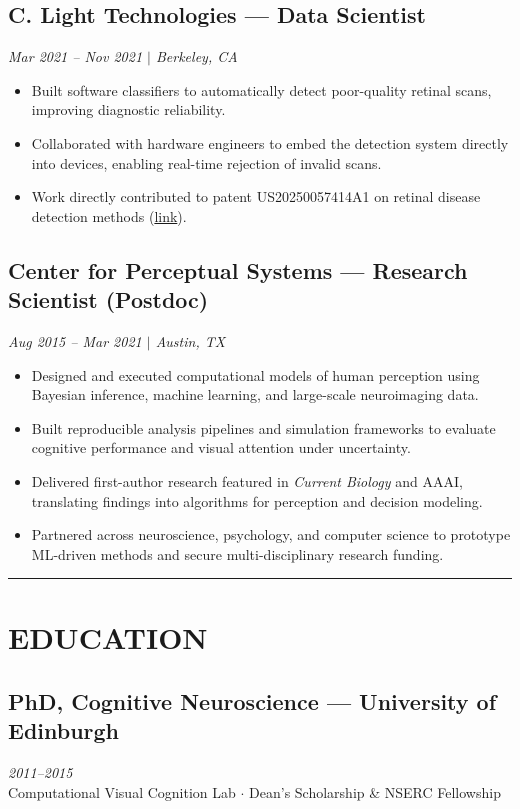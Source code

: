 \documentclass[11pt,a4paper]{article}
\newcommand{\sepline}{\noindent\rule{\textwidth}{0.5pt}\vspace{0.5em}}
\begin{document}
\subsection*{C. Light Technologies --- Data Scientist}
\textit{Mar 2021 -- Nov 2021 $\mid$ Berkeley, CA}
\begin{itemize}
    \item Built software classifiers to automatically detect poor-quality retinal scans, improving diagnostic reliability.
    \item Collaborated with hardware engineers to embed the detection system directly into devices, enabling real-time rejection of invalid scans.
    \item Work directly contributed to patent US20250057414A1 on retinal disease detection methods (\href{https://patents.google.com/patent/US20250057414A1/}{link}).
\end{itemize}

\subsection*{Center for Perceptual Systems --- Research Scientist (Postdoc)}
\textit{Aug 2015 -- Mar 2021 $\mid$ Austin, TX}
\begin{itemize}
    \item Designed and executed computational models of human perception using Bayesian inference, machine learning, and large-scale neuroimaging data.
    \item Built reproducible analysis pipelines and simulation frameworks to evaluate cognitive performance and visual attention under uncertainty.
    \item Delivered first-author research featured in \textit{Current Biology} and AAAI, translating findings into algorithms for perception and decision modeling.
    \item Partnered across neuroscience, psychology, and computer science to prototype ML-driven methods and secure multi-disciplinary research funding.
\end{itemize}

\vspace{0.5em}
\sepline

\section*{EDUCATION}

\subsection*{PhD, Cognitive Neuroscience --- University of Edinburgh}
\textit{2011--2015}\\
Computational Visual Cognition Lab $\cdot$ Dean's Scholarship \& NSERC Fellowship
\end{document}

